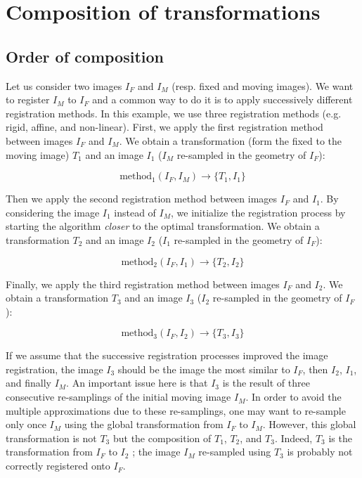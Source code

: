 \section{Composition of transformations}



\subsection{Order of composition}
\label{subsec:tools:composition:order}

Let us consider two images $I_F$ and $I_M$ (resp. fixed and moving images). We want to register $I_M$ to $I_F$ and a common way to do it is to apply successively different registration methods. In this example, we use three registration methods (e.g. rigid, affine, and non-linear). First, we apply the first registration method between images $I_F$ and $I_M$. We obtain a transformation (form the fixed to the moving image) $T_1$ and an image $I_1$ ($I_M$ re-sampled in the geometry of $I_F$):

\begin{equation}
\textrm{method}_1(I_F,I_M) \rightarrow \{T_1,I_1\}
\end{equation}

Then we apply the second registration method between images $I_F$ and $I_1$. By considering the image $I_1$ instead of $I_M$, we initialize the registration process by starting the algorithm \textit{closer} to the optimal transformation. We obtain a transformation $T_2$ and an image $I_2$ ($I_1$ re-sampled in the geometry of $I_F$):

\begin{equation}
\textrm{method}_2(I_F,I_1) \rightarrow \{T_2,I_2\}
\end{equation}

Finally, we apply the third registration method between images $I_F$ and $I_2$. We obtain a transformation $T_3$ and an image $I_3$ ($I_2$ re-sampled in the geometry of $I_F$):

\begin{equation}
\textrm{method}_3(I_F,I_2) \rightarrow \{T_3,I_3\}
\end{equation}

If we assume that the successive registration processes improved the image registration, the image $I_3$ should be the image the most similar to $I_F$, then $I_2$, $I_1$, and finally $I_M$. An important issue here is that $I_3$ is the result of three consecutive re-samplings of the initial moving image $I_M$. In order to avoid the multiple approximations due to these re-samplings, one may want to re-sample only once $I_M$ using the global transformation from $I_F$ to $I_M$. However, this global transformation is not $T_3$ but the composition of $T_1$, $T_2$, and $T_3$. Indeed, $T_3$ is the transformation from $I_F$ to $I_2$ ; the image $I_M$ re-sampled using $T_3$ is probably not correctly registered onto $I_F$.
\\

